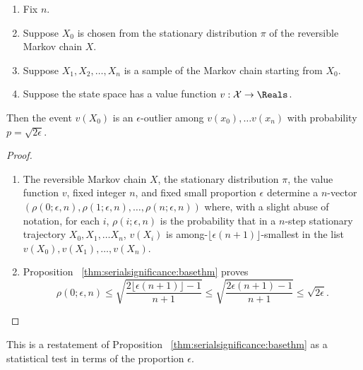 \documentclass[12pt]{article}
\begin{document}
\begin{corollary}
    \label{thm:serialsignificance:sqrtepstest}
    \begin{enumerate}
        \item
            Fix \( n \).
        \item
            Suppose \( X_0 \) is chosen from the stationary
            distribution \( \pi \) of the reversible Markov chain \( X \).
        \item
            Suppose \( X_1, X_2, \dots, X_n \) is a sample of the Markov
            chain starting from \( X_0 \).
        \item
            Suppose the state space has a value function \( v : \mathcal
            {X} \to \Reals \).
    \end{enumerate}
    Then the event \( v(X_0) \) is an \( \epsilon \)-outlier among \( v(x_0),
    \dots v(x_n ) \) with probability \( p = \sqrt{2\epsilon} \).
\end{corollary}

\begin{proof}
    \begin{enumerate}
        \item
            The reversible Markov chain \( X \), the stationary
            distribution \( \pi \), the value function \( v \), fixed
            integer \( n \), and fixed small proportion \( \epsilon \)
            determine a \( n \)-vector \( (\rho(0; \epsilon, n), \rho(1;
            \epsilon, n), \dots, \rho(n; \epsilon, n)) \) where, with a
            slight abuse of notation, for each \( i \), \( \rho(i;
            \epsilon, n) \) is the probability that in a \( n \)-step
            stationary trajectory \( X_0, X_1, \dots X_n \), \( v(X_i) \)
            is among-\( \lfloor \epsilon(n+1) \rfloor \)-smallest in the
            list \( v(X_0), v(X_1), \dots, v(X_n) \).
        \item
            Proposition~%
            \ref{thm:serialsignificance:basethm} proves
            \[
                \rho(0; \epsilon, n) \le \sqrt{\frac{2 \lfloor \epsilon
                (n+1) \rfloor - 1}{n+1}} \le \sqrt{\frac{2 \epsilon (n+1)-1}{n+1}}
                \le \sqrt{2\epsilon}.
            \]
    \end{enumerate}
\end{proof}

\begin{remark}
    This is a restatement of Proposition~%
    \ref{thm:serialsignificance:basethm} as a statistical test in terms
    of the proportion \( \epsilon \).

\end{remark}
\end{document}
